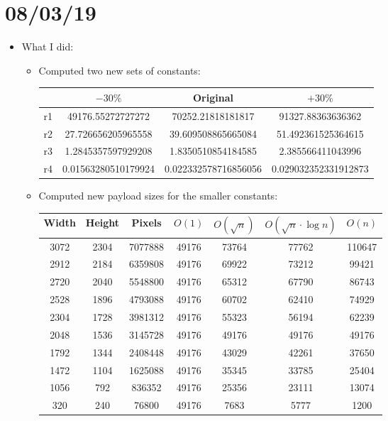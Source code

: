 \documentclass[11pt,a4paper]{report}
\begin{document}
\section{08/03/19}

\begin{itemize}

  \item What I did:
    \begin{itemize}
      \item Computed two new sets of constants:
      \begin{center}
        \begin{tabular}{ c | c c c }
        & $-30\%$ & Original & $+30\%$ \\ \hline
        r1 & 49176.55272727272 & 70252.21818181817 & 91327.88363636362 \\
        r2 & 27.726656205965558 & 39.609508865665084 & 51.492361525364615 \\
        r3 & 1.2845357597929208 & 1.8350510854184585 & 2.385566411043996 \\
        r4 & 0.01563280510179924 & 0.022332578716856056 & 0.029032352331912873 \\
        \end{tabular}
      \end{center}
      
      \item Computed new payload sizes for the smaller constants:
      \begin{center}
        \begin{tabular}{ c c c | c c c c }
        Width & Height & Pixels & $O(1)$ & $O(\sqrt{n})$ & $O(\sqrt{n} \cdot \log n)$ & $O(n)$ \\ \hline
        3072 & 2304 & 7077888 & 49176 & 73764 & 77762 & 110647 \\
        2912 & 2184 & 6359808 & 49176 & 69922 & 73212 & 99421 \\
        2720 & 2040 & 5548800 & 49176 & 65312 & 67790 & 86743 \\
        2528 & 1896 & 4793088 & 49176 & 60702 & 62410 & 74929 \\
        2304 & 1728 & 3981312 & 49176 & 55323 & 56194 & 62239 \\
        2048 & 1536 & 3145728 & 49176 & 49176 & 49176 & 49176 \\
        1792 & 1344 & 2408448 & 49176 & 43029 & 42261 & 37650 \\
        1472 & 1104 & 1625088 & 49176 & 35345 & 33785 & 25404 \\
        1056 & 792 & 836352 & 49176 & 25356 & 23111 & 13074 \\
        320 & 240 & 76800 & 49176 & 7683 & 5777 & 1200 \\
        \end{tabular}
      \end{center}
      

\end{itemize}
\end{itemize}
\end{document}

